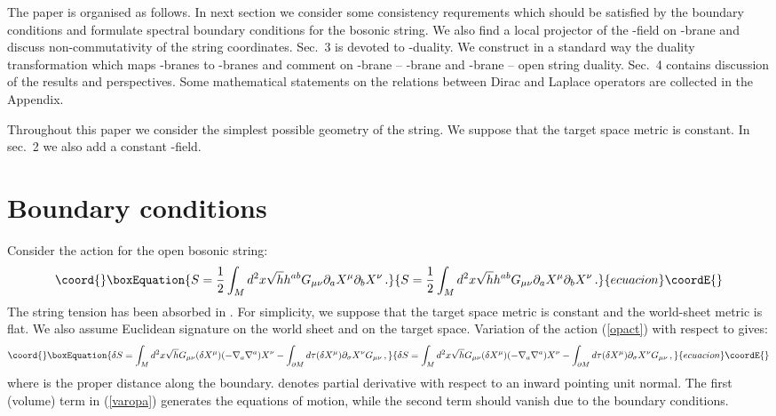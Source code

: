 \documentclass[a4paper,12pt,twoside]{article}
\begin{document}
The paper is organised as follows. In next section we consider
some consistency requrements which should be satisfied by
the boundary conditions and formulate spectral boundary
conditions for the bosonic string. We also find a local
projector of the \coordHE{}-field on \coordHE{}-brane and discuss non-commutativity
of the string coordinates. Sec.~3 is devoted to \coordHE{}-duality.
We construct in a standard way the duality transformation
which maps \coordHE{}-branes to \coordHE{}-branes and comment on \coordHE{}-brane --
\coordHE{}-brane and \coordHE{}-brane -- open string duality. Sec.~4 contains
discussion of the results and perspectives. Some mathematical
statements on the relations between Dirac and Laplace operators are 
collected in the Appendix. 

Throughout this paper we consider the simplest possible
geometry of the string. We suppose that the target
space metric is constant. In sec.~2 we also add a constant
\coordHE{}-field.

 

\section{Boundary conditions}\label{secbc}
Consider the action for the open bosonic string:
\begin{equation}\coord{}\boxEquation{
S=\frac 12 \int_M d^2x \sqrt{h} h^{ab}G_{\mu\nu}\partial_a X^\mu
\partial_b X^\nu \,. \label{opact}
}{
S=\frac 12 \int_M d^2x \sqrt{h} h^{ab}G_{\mu\nu}\partial_a X^\mu
\partial_b X^\nu \,. }{ecuacion}\coordE{}\end{equation}
The string tension \coordHE{} has been absorbed in \coordHE{}.
For simplicity, we suppose that the target space metric \coordHE{} is
constant and the world-sheet metric \coordHE{} is flat. 
We also assume Euclidean signature on the world
sheet and on the target space. Variation of the action
(\ref{opact}) with respect to \coordHE{} gives:
\begin{equation}\coord{}\boxEquation{
\delta S= \int_M d^2x \sqrt{h} G_{\mu\nu} (\delta X^\mu)
(-\nabla_a \nabla^a )X^\nu -\int_{\partial M} d\tau 
(\delta X^\mu )\partial_\sigma X^\nu G_{\mu\nu} \,,
\label{varopa}
}{
\delta S= \int_M d^2x \sqrt{h} G_{\mu\nu} (\delta X^\mu)
(-\nabla_a \nabla^a )X^\nu -\int_{\partial M} d\tau 
(\delta X^\mu )\partial_\sigma X^\nu G_{\mu\nu} \,,
}{ecuacion}\coordE{}\end{equation}
where \myHighlight{$\tau$}\coordHE{} is the proper distance along the boundary.
\myHighlight{$\partial_\sigma$}\coordHE{} denotes partial derivative with respect to
an inward pointing unit normal. The first (volume) term in
(\ref{varopa}) generates the equations of motion, while
the second term should vanish due to the boundary conditions.
\end{document}
